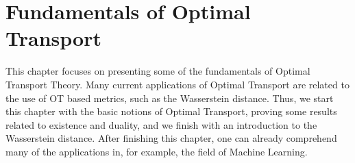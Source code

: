 \newpage
\chapter{Fundamentals of Optimal Transport}

This chapter focuses on presenting some of the fundamentals of Optimal Transport Theory.
Many current applications of Optimal Transport are related to the use of OT based metrics, such
as the Wasserstein distance. Thus, we start this chapter with the basic notions of Optimal
Transport, proving some results related to existence and duality, and we finish with
an introduction to the Wasserstein distance. After finishing this chapter, one can already
comprehend many of the applications in, for example, the field of Machine Learning.






